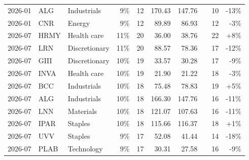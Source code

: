 \documentclass[11pt,a4paper]{article}
\begin{document}
{\begin{longtable}{l l l r r r r r r r}
2026-01 & ALG & Industrials & 9\% & 12 & 170.43 & 147.76 &  & 10 & -13\% \\
2026-01 & CNR & Energy & 9\% & 12 & 89.89 & 86.93 &  & 12 & -3\% \\
2026-07 & HRMY & Health care & 11\% & 20 & 36.00 & 38.76 &  & 22 & +8\% \\
2026-07 & LRN & Discretionary & 11\% & 20 & 88.57 & 78.36 &  & 17 & -12\% \\
2026-07 & GIII & Discretionary & 10\% & 19 & 33.57 & 30.28 &  & 17 & -9\% \\
2026-07 & INVA & Health care & 10\% & 19 & 21.90 & 21.22 &  & 18 & -3\% \\
2026-07 & BCC & Industrials & 10\% & 18 & 75.48 & 78.83 &  & 19 & +5\% \\
2026-07 & ALG & Industrials & 10\% & 18 & 166.30 & 147.76 &  & 16 & -11\% \\
2026-07 & LNN & Materials & 10\% & 18 & 121.07 & 107.63 &  & 16 & -11\% \\
2026-07 & IPAR & Staples & 10\% & 18 & 115.66 & 116.37 &  & 18 & +1\% \\
2026-07 & UVV & Staples & 9\% & 17 & 52.08 & 41.44 &  & 14 & -18\% \\
2026-07 & PLAB & Technology & 9\% & 17 & 30.31 & 27.58 &  & 16 & -9\% \\
\hline
\end{longtable}}
\end{document}
